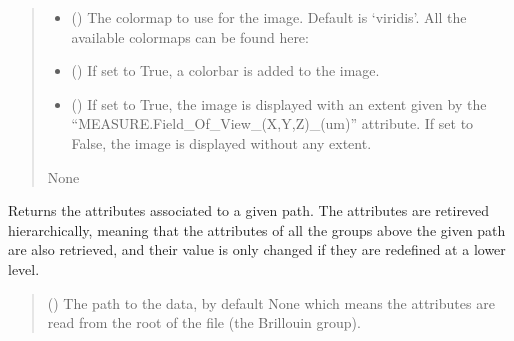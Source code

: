 \documentclass[letterpaper,10pt,english]{sphinxmanual}
\begin{document}
\begin{fulllineitems}
\begin{fulllineitems}
\begin{quote}
\begin{description}
\begin{itemize}
\item {} 
\sphinxAtStartPar
{} (\sphinxstyleliteralemphasis{\sphinxupquote{, }}) \textendash{} The colormap to use for the image. Default is ‘viridis’. All the available colormaps can be found here: 

\item {} 
\sphinxAtStartPar
{} (\sphinxstyleliteralemphasis{\sphinxupquote{, }}) \textendash{} If set to True, a colorbar is added to the image.

\item {} 
\sphinxAtStartPar
{} (\sphinxstyleliteralemphasis{\sphinxupquote{, }}) \textendash{} If set to True, the image is displayed with an extent given by the “MEASURE.Field\_Of\_View\_(X,Y,Z)\_(um)” attribute. If set to False, the image is displayed without any extent.

\end{itemize}

\sphinxAtStartPar
None

\end{description}\end{quote}

\end{fulllineitems}


\begin{fulllineitems}
\label{\detokenize{_autosummary/HDF5_BLS.wrapper:HDF5_BLS.wrapper.Wrapper.get_attributes}}
\pysigstartsignatures
\pysiglinewithargsret
{}
{}
{}
\pysigstopsignatures
\sphinxAtStartPar
Returns the attributes associated to a given path. The attributes are retireved hierarchically, meaning that the attributes of all the groups above the given path are also retrieved, and their value is only changed if they are redefined at a lower level.
\begin{quote}\begin{description}
\sphinxAtStartPar
{} (\sphinxstyleliteralemphasis{\sphinxupquote{, }}) \textendash{} The path to the data, by default None which means the attributes are read from the root of the file (the Brillouin group).


\end{description}
\end{quote}
\end{fulllineitems}
\end{fulllineitems}
\end{document}
